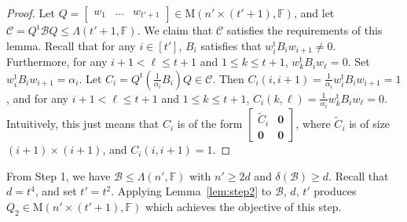\documentclass[10pt]{article}
\newcommand{\tuple}[1]{\mathbf{#1}}
\newcommand{\spa}[1]{\mathcal{#1}}
\newcommand{\F}{\mathbb{F}}
\newcommand{\M}{\mathrm{M}}
\newcommand{\cB}{\spa{B}}
\newcommand{\cC}{\spa{C}}
\newcommand{\vzero}{\tuple{0}}
\newcommand{\tr}[1]{#1^{\mathrm{t}}}
\begin{document}
\begin{proof}
Let $Q=\begin{bmatrix} w_1 & \dots & 
w_{t'+1}\end{bmatrix}\in\M(n'\times(t'+1),\F)$, 
and let $\cC=\tr{Q}\cB Q\leq\Lambda(t'+1, \F)$. We claim that $\cC$ satisfies the 
requirements of this lemma. Recall that for any $i\in[t']$, $B_i$ satisfies that 
$\tr{w_i}B_iw_{i+1}\neq 0$. Furthermore, for any $i+1<\ell\leq t+1$ and $1\leq 
k\leq 
t+1$, $\tr{w_k}B_iw_\ell=0$. Set $\tr{w_i}B_iw_{i+1}=\alpha_i$. Let
$C_i=\tr{Q}(\frac{1}{\alpha_i} B_i)Q\in \cC$. Then $C_i(i, 
i+1)=\frac{1}{\alpha_i}\tr{w_i}B_iw_{i+1}=1$, and for any $i+1<\ell\leq t+1$ and 
$1\leq k\leq t+1$, $C_i(k, \ell)=\frac{1}{\alpha_i}\tr{w_k}B_iw_\ell=0$. 
Intuitively, this just 
means 
that $C_i$ is of the form $\begin{bmatrix}
\tilde C_i & \vzero\\
\vzero & \vzero
\end{bmatrix}$, where $\tilde C_i$ is of size $(i+1)\times (i+1)$, and $C_i(i, 
i+1)=1$. 
\end{proof}

From Step 1, we have $\cB\leq\Lambda(n', \F)$ with 
$n'\geq 
2d$ and $\delta(\cB)\geq d$. Recall that $d=t^4$, and set $t'=t^2$. Applying 
Lemma~\ref{lem:step2} to $\cB$, $d$, $t'$ produces $Q_2\in\M(n'\times(t'+1), \F)$ 
which achieves the objective of this step. 
\end{document}
